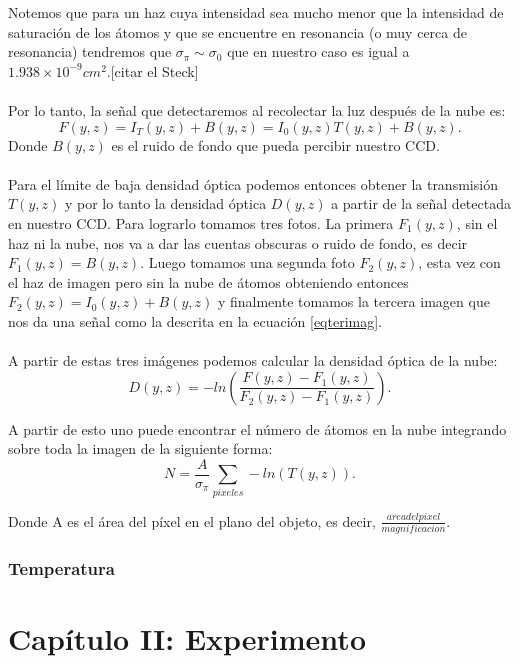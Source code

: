 \documentclass[12pt,twoside]{article}
\begin{document}
Notemos que para un haz cuya intensidad sea mucho menor que la intensidad de saturación de los átomos y que se encuentre en resonancia (o muy cerca de resonancia) tendremos que $\sigma_{\pi} \sim \sigma_{0}$ que en nuestro caso es igual a $1.938 \times 10^{-9} cm^2$.[citar el Steck]\\
\\
Por lo tanto, la señal que detectaremos al recolectar la luz después de la nube es:
\begin{equation}
    F(y,z) = I_{T}(y,z) + B(y,z) = I_{0}(y,z)T(y,z) + B(y,z).
    \label{eqterimag}
\end{equation}
Donde $B(y,z)$ es el ruido de fondo que pueda percibir nuestro CCD.\\
\\
Para el límite de baja densidad óptica podemos entonces obtener la transmisión $T(y,z)$ y por lo tanto la densidad óptica $D(y,z)$ a partir de la señal detectada en nuestro CCD. Para lograrlo tomamos tres fotos. La primera $F_{1}(y,z)$, sin el haz ni la nube, nos va a dar las cuentas obscuras o ruido de fondo, es decir $F_{1}(y,z)=B(y,z)$. Luego tomamos una segunda foto $F_{2}(y,z)$, esta vez con el haz de imagen pero sin la nube de átomos obteniendo entonces $F_{2}(y,z) = I_{0}(y,z) + B(y,z)$ y finalmente tomamos la tercera imagen que nos da una señal como la descrita en la ecuación \ref{eqterimag}.\\
\\
A partir de estas tres imágenes podemos calcular la densidad óptica de la nube: 
\begin{equation}
%
    D(y,z) = - ln\left(\frac{F(y,z)-F_{1}(y,z)}{F_{2}(y,z)-F_{1}(y,z)}\right).
%
\end{equation}

A partir de esto uno puede encontrar el número de átomos en la nube integrando sobre toda la imagen de la siguiente forma:
\begin{equation}
%
    N = \frac{A}{\sigma_\pi} \sum_{pixeles} -ln(T(y,z)).
%    
\end{equation}

Donde A es el área del píxel en el plano del objeto, es decir, $\frac{area del pixel}{magnificacion}$.

\subsubsection{Temperatura}\label{teotemp}


\section{Capítulo II: Experimento}\label{experimento}
\end{document}
